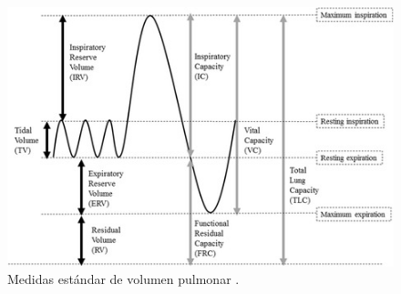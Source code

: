 \documentclass[12pt]{article}
\begin{document}
    

\begin{figure}[ht]
\centering
\includegraphics[scale=0.6]{imag/volumeslung.jpeg}
\caption{Medidas estándar de volumen pulmonar \cite{18}. }
\label{2}
\end{figure}
\FloatBarrier

\end{document}
